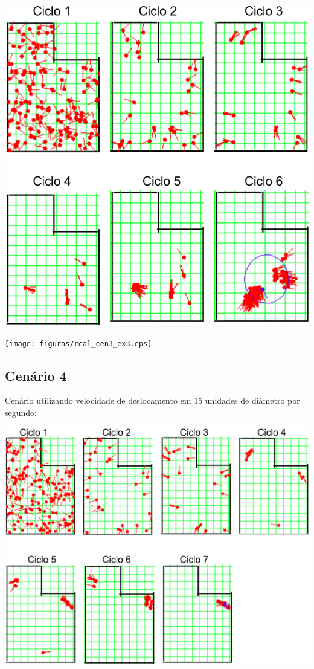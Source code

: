 {\centering
\includegraphics[scale=0.4]{figuras/cen3_ex3.eps}
\label{img:cen3_ex3}
\par}

{\centering
\texttt{[image: figuras/real\_cen3\_ex3.eps]}
\label{img:real_cen3_ex3}
\par}

\subsection{Cenário 4}

Cenário utilizando velocidade de deslocamento em 15 unidades de diâmetro por segundo:

{\centering
\includegraphics[scale=0.4]{figuras/cen3_ex4.eps}
\label{img:cen3_ex4}
\par}

